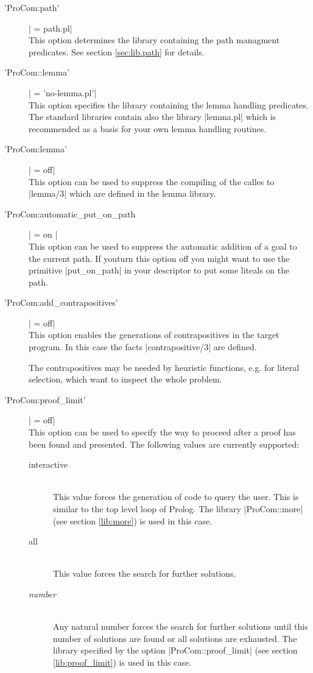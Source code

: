 \begin{description}
  \item ['ProCom:path'] | = path.pl|\label{opt:ProCom:path}
    \\
    This option determines the library containing the path managment
    predicates.  See section \ref{sec:lib.path} for details.

  \item ['ProCom::lemma'] | = 'no-lemma.pl'|
    \\
    This option specifies the library containing the lemma handling
    predicates.  The standard libraries contain also the library |lemma.pl|
    which is recommended as a basis for your own lemma handling routines.

  \item ['ProCom:lemma'] | = off|
    \\
    This option can be used to suppress the compiling of the calles to
    |lemma/3| which are defined in the lemma library.

  \item ['ProCom:automatic\_put\_on\_path] | = on |
    \\
    This option can be used to suppress the automatic addition of a goal to
    the current path. If youturn this option off you might want to use the
    primitive |put_on_path| in your descriptor to put some liteals on the
    path.

  \item ['ProCom:add\_contrapositives'] | = off|
    \\
    This option enables the generations of contrapositives in the target
    program. In this case the facts |contrapositive/3| are defined.

    The contrapositives may be needed by heuristic functions, e.g. for literal
    selection, which want to inspect the whole problem.

  \item ['ProCom:proof\_limit'] | = off|
    \\
  This option can be used to specify the way to proceed after a proof has been
  found and presented. The following values are currently supported:
  \begin{description}
    \item [interactive]\ 
      \\
      This value forces the generation of code to query the user. This is
      similar to the top level loop of Prolog. The library |ProCom::more| (see
      section \ref{lib:more}) is used in this case.
    \item [all]\ 
      \\
      This value forces the search for further solutions.
    \item [{\em number}]\ 
      \\
      Any natural number forces the search for further solutions until this
      number of solutions are found or all solutions are exhausted. The
      library specified by the option |ProCom::proof_limit| (see section
      \ref{lib:proof_limit}) is used in this case.
  \end{description}


\end{description}

